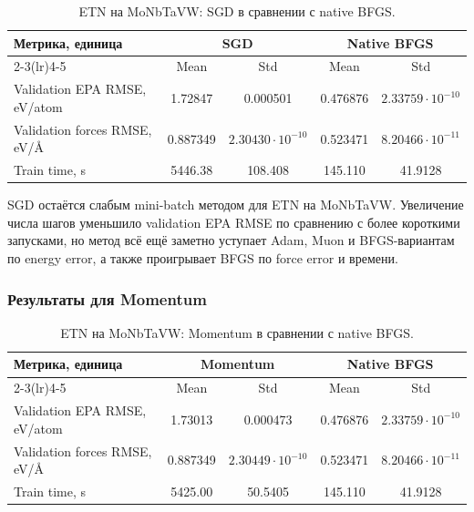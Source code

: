 \begin{table}[H]
\centering
\small
\caption{ETN на MoNbTaVW: SGD в сравнении с native BFGS.}
\label{tab:etn-monbtavw-sgd}
\begin{tabular}{lcccc}
\toprule
\multirow{2}{*}{Метрика, единица} & \multicolumn{2}{c}{SGD} & \multicolumn{2}{c}{Native BFGS} \\
\cmidrule(lr){2-3}\cmidrule(lr){4-5}
 & Mean & Std & Mean & Std \\
\midrule
Validation EPA RMSE, eV/atom & 1.72847 & 0.000501 & 0.476876 & \(2.33759\cdot 10^{-10}\) \\
Validation forces RMSE, eV/\AA & 0.887349 & \(2.30430\cdot 10^{-10}\) & 0.523471 & \(8.20466\cdot 10^{-11}\) \\
Train time, s & 5446.38 & 108.408 & 145.110 & 41.9128 \\
\bottomrule
\end{tabular}
\end{table}


SGD остаётся слабым mini-batch методом для ETN на MoNbTaVW. Увеличение числа шагов уменьшило validation EPA RMSE по сравнению с более короткими запусками, но метод всё ещё заметно уступает Adam, Muon и BFGS-вариантам по energy error, а также проигрывает BFGS по force error и времени.

\FloatBarrier

\subsubsection{Результаты для Momentum}

\begin{table}[H]
\centering
\small
\caption{ETN на MoNbTaVW: Momentum в сравнении с native BFGS.}
\label{tab:etn-monbtavw-momentum}
\begin{tabular}{lcccc}
\toprule
\multirow{2}{*}{Метрика, единица} & \multicolumn{2}{c}{Momentum} & \multicolumn{2}{c}{Native BFGS} \\
\cmidrule(lr){2-3}\cmidrule(lr){4-5}
 & Mean & Std & Mean & Std \\
\midrule
Validation EPA RMSE, eV/atom & 1.73013 & 0.000473 & 0.476876 & \(2.33759\cdot 10^{-10}\) \\
Validation forces RMSE, eV/\AA & 0.887349 & \(2.30449\cdot 10^{-10}\) & 0.523471 & \(8.20466\cdot 10^{-11}\) \\
Train time, s & 5425.00 & 50.5405 & 145.110 & 41.9128 \\
\bottomrule
\end{tabular}
\end{table}

